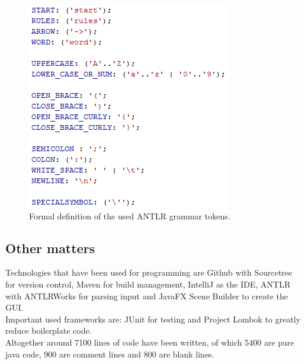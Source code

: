 \begin{figure} [h]
	\centering
	\includegraphics{abb/antrlTokens.png}
	\caption{Formal definition of the used ANTLR grammar tokens.}
	\label{antlrGrammarTokens}
\end{figure}

\pagebreak
\subsection{Other matters}

Technologies that have been used for programming are Github \cite{github} with Sourcetree \cite{sourcetree} for version control, Maven \cite{maven} for build management, IntelliJ\cite{intellij} as the IDE, ANTLR \cite{antlr} with ANTLRWorks for parsing input and JavaFX Scene Builder \cite{scenebuilder} to create the GUI. \\

\noindent Important used frameworks are: JUnit \cite{junit} for testing and Project Lombok \cite{lombok} to greatly reduce boilerplate code.\\

\noindent Altogether around 7100 lines of code have been written, of which 5400 are pure java code, 900 are comment lines and 800 are blank lines.\\ 
\pagebreak